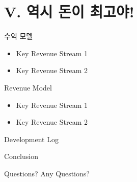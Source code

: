 \documentclass{beamer}
\begin{document}
\section{V. 역시 돈이 최고야!}
\begin{frame}{수익 모델}
	\begin{itemize}[<+->]
		\item Key Revenue Stream 1
		\item Key Revenue Stream 2
	\end{itemize}
\end{frame}

\begin{frame}{Revenue Model}
	\begin{itemize}[<+->]
		\item Key Revenue Stream 1
		\item Key Revenue Stream 2
	\end{itemize}
\end{frame}

\begin{frame}{Development Log}
	\begin{tikzpicture}
	\end{tikzpicture}
\end{frame}

\begin{frame}{Conclusion}
\end{frame}

\begin{frame}{Questions?}
	\centering \Large
	Any Questions?
\end{frame}
\end{document}
